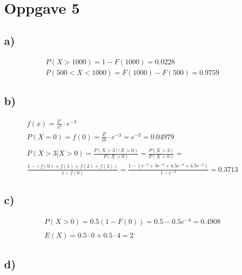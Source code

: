 \section*{Oppgave 5}

\subsection*{a)}

\begin{gather*}
	P(X > 1000) = 1 - F(1000) = 0.0228
	\\
	P(500 < X < 1000) = F(1000) - F(500) = 0.9759
\end{gather*}


\subsection*{b)}

\begin{gather*}
	f(x) = \frac{3^x}{x!} \cdot e^{-3}
	\\
	P(X = 0) = f(0) = \frac{3^0}{0!} \cdot e^{-3} = e^{-3} = 0.04979
	\\
	\\
	P(X > 3 | X > 0) = \frac{P(X > 3 \cap X > 0)}{P(X > 0)} = \frac{P(X > 3)}{P(X > 0)}
	=
	\\
	\frac{1 - (f(0) + f(1) + f(2) + f(3))}{1 - f(0)}
	=
	\frac{1 - (e^{-3} + 3 e^{-3} + 4.5 e^{-3} + 4.5 e^{-3})}{1 - e^{-3}} = 0.3713
\end{gather*}


\subsection*{c)}

\begin{gather*}
	P(X > 0) = 0.5 (1 - F(0)) = 0.5 - 0.5 e^{-4} = 0.4908
	\\
	\\
	E(X) = 0.5 \cdot 0 + 0.5 \cdot 4 = 2
\end{gather*}


\subsection*{d)}

